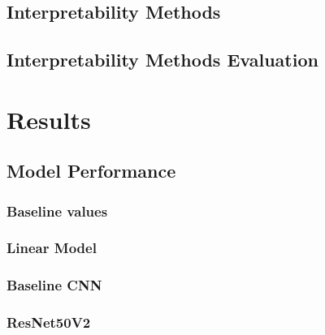 \documentclass[biblatexBackend=bibtex]{tumthesis}
\begin{document}
\section{Interpretability Methods}
\label{sec:methodology:interpretability_methods}


%

\section{Interpretability Methods Evaluation}
\label{sec:methodology:vgig_eval}

\chapter{Results}
\label{ch:results}


\section{Model Performance}
\label{sec:model_performance}

\subsection{Baseline values}
\label{sec:results:bl_values}

\subsection{Linear Model}
\label{sec:results:lm}

\subsection{Baseline CNN}
\label{sec:results:bl_cnn}

\subsection{ResNet50V2}
\label{sec:results:RN50V2}
\end{document}
